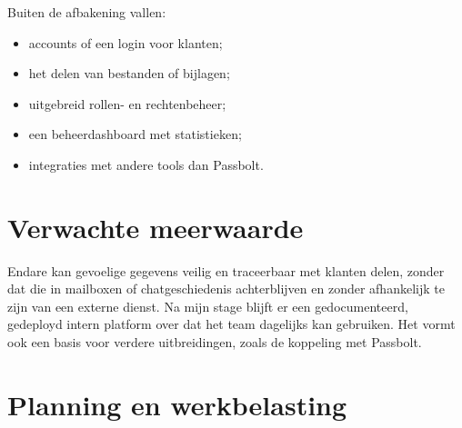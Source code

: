 Buiten de afbakening vallen:
\begin{itemize}
  \item accounts of een login voor klanten;
  \item het delen van bestanden of bijlagen;
  \item uitgebreid rollen- en rechtenbeheer;
  \item een beheerdashboard met statistieken;
  \item integraties met andere tools dan Passbolt.
\end{itemize}

\section{Verwachte meerwaarde}%
\label{vst:meerwaarde}

Endare kan gevoelige gegevens veilig en traceerbaar met klanten delen, zonder
dat die in mailboxen of chatgeschiedenis achterblijven en zonder afhankelijk
te zijn van een externe dienst. Na mijn stage blijft er een gedocumenteerd,
gedeployd intern platform over dat het team dagelijks kan gebruiken. Het
vormt ook een basis voor verdere uitbreidingen, zoals de koppeling met
Passbolt.


\section{Planning en werkbelasting}%
\label{vst:planning}

